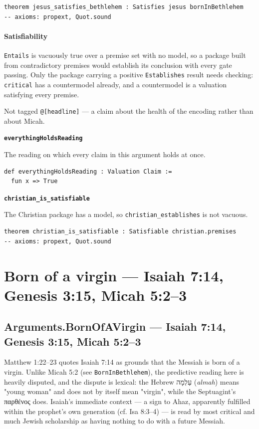 \documentclass[11pt]{article}
\begin{document}
{\small\begin{verbatim}
theorem jesus_satisfies_bethlehem : Satisfies jesus bornInBethlehem
-- axioms: propext, Quot.sound
\end{verbatim}}
\paragraph*{Satisfiability}
\leavevmode\par
\texttt{Entails} is vacuously true over a premise set with no model, so a package built from contradictory premises would establish its conclusion with every gate passing. Only the package carrying a positive \texttt{Establishes} result needs checking: \texttt{critical} has a countermodel already, and a countermodel is a valuation satisfying every premise.

Not tagged \texttt{@[headline]} — a claim about the health of the encoding rather than about Micah.

\par\medskip\noindent\textbf{\texttt{everything\allowbreak{}Holds\allowbreak{}Reading}}\par\nobreak\noindent
The reading on which every claim in this argument holds at once.

{\small\begin{verbatim}
def everythingHoldsReading : Valuation Claim :=
  fun x => True
\end{verbatim}}
\par\medskip\noindent\textbf{\texttt{christian\_\allowbreak{}is\_\allowbreak{}satisfiable}}\par\nobreak\noindent
The Christian package has a model, so \texttt{christian\_\allowbreak{}establishes} is not vacuous.

{\small\begin{verbatim}
theorem christian_is_satisfiable : Satisfiable christian.premises
-- axioms: propext, Quot.sound
\end{verbatim}}
\clearpage
\section*{Born of a virgin — Isaiah 7:14, Genesis 3:15, Micah 5:2–3}

\subsection*{Arguments.BornOfAVirgin — Isaiah 7:14, Genesis 3:15, Micah 5:2–3}
Matthew 1:22–23 quotes Isaiah 7:14 as grounds that the Messiah is born of a virgin. Unlike Micah 5:2 (see \texttt{Born\allowbreak{}In\allowbreak{}Bethlehem}), the predictive reading here is heavily disputed, and the dispute is lexical: the Hebrew עַלְמָה (\emph{almah}) means "young woman" and does not by itself mean "virgin", while the Septuagint's παρθένος does. Isaiah's immediate context — a sign to Ahaz, apparently fulfilled within the prophet's own generation (cf. Isa 8:3–4) — is read by most critical and much Jewish scholarship as having nothing to do with a future Messiah.
\end{document}
